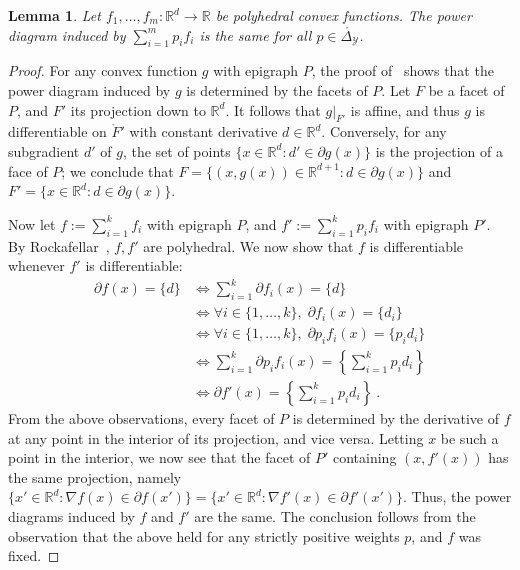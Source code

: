 \documentclass[12pt]{article}
\newcommand{\reals}{\mathbb{R}}
\newcommand{\simplex}{\Delta_\Y}
\newcommand{\Y}{\mathcal{Y}}
\newcommand{\inter}[1]{\mathring{#1}}%
\newtheorem{lemma}{Lemma}
\begin{document}
\begin{lemma}\label{lem:polyhedral-pd-same}
  Let $f_1,\ldots,f_m:\reals^d\to\reals$ be polyhedral convex functions.
  The power diagram induced by $\sum_{i=1}^m p_i f_i$ is the same for all $p \in \inter\simplex$.
\end{lemma}
\begin{proof}
  For any convex function $g$ with epigraph $P$, the proof of~\citet[Theorem 4]{aurenhammer1987power} shows that the power diagram induced by $g$ is determined by the facets of $P$.
  Let $F$ be a facet of $P$, and $F'$ its projection down to $\reals^d$.
  It follows that $g|_{F'}$ is affine, and thus $g$ is differentiable on $\inter F'$ with constant derivative $d\in\reals^d$.
  Conversely, for any subgradient $d'$ of $g$, the set of points $\{x\in\reals^d : d'\in\partial g(x)\}$ is the projection of a face of $P$; we conclude that $F = \{(x,g(x))\in\reals^{d+1} : d\in\partial g(x)\}$ and $F' = \{x\in\reals^d : d\in\partial g(x)\}$.

  Now let $f := \sum_{i=1}^k f_i$ with epigraph $P$, and $f' := \sum_{i=1}^k p_i f_i$ with epigraph $P'$.
  By Rockafellar~\cite{rockafellar1997convex}, $f,f'$ are polyhedral.
  We now show that $f$ is differentiable whenever $f'$ is differentiable:
  \begin{align*}
    \partial f(x) = \{d\}
    &\iff \sum_{i=1}^k \partial f_i(x) = \{d\} \\
    &\iff \forall i\in\{1,\ldots,k\}, \; \partial f_i(x) = \{d_i\} \\
    &\iff \forall i\in\{1,\ldots,k\}, \; \partial p_i f_i(x) = \{p_id_i\} \\
    &\iff \sum_{i=1}^k \partial p_if_i(x) = \left\{\sum_{i=1}^k p_id_i\right\} \\
    &\iff \partial f'(x) = \left\{\sum_{i=1}^k p_id_i\right\}~.
  \end{align*}
  From the above observations, every facet of $P$ is determined by the derivative of $f$ at any point in the interior of its projection, and vice versa.
  Letting $x$ be such a point in the interior, we now see that the facet of $P'$ containing $(x,f'(x))$ has the same projection, namely $\{x'\in\reals^d : \nabla f(x) \in \partial f(x')\} = \{x'\in\reals^d : \nabla f'(x) \in \partial f'(x')\}$.
  Thus, the power diagrams induced by $f$ and $f'$ are the same.
  The conclusion follows from the observation that the above held for any strictly positive weights $p$, and $f$ was fixed.
\end{proof}
\end{document}
